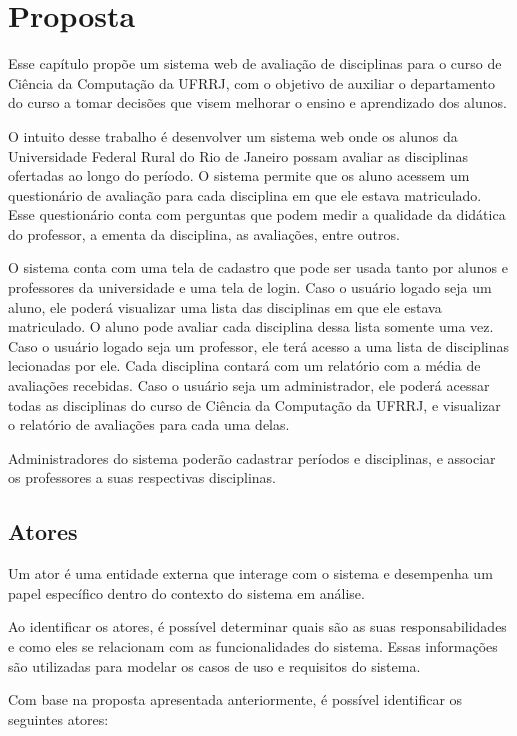 \section{Proposta}

Esse capítulo propõe um sistema web de avaliação de disciplinas para o curso de Ciência da Computação da UFRRJ, com o objetivo de auxiliar o departamento do curso a tomar decisões que visem melhorar o ensino e aprendizado dos alunos.

O intuito desse trabalho é desenvolver um sistema web onde os alunos da Universidade Federal Rural do Rio de Janeiro possam avaliar as disciplinas ofertadas ao longo do período. O sistema permite que os aluno acessem um questionário de avaliação para cada disciplina em que ele estava matriculado. Esse questionário conta com perguntas que podem medir a qualidade da didática do professor, a ementa da disciplina, as avaliações, entre outros.

O sistema conta com uma tela de cadastro que pode ser usada tanto por alunos e professores da universidade e uma tela de login. Caso o usuário logado seja um aluno, ele poderá visualizar uma lista das disciplinas em que ele estava matriculado. O aluno pode avaliar cada disciplina dessa lista somente uma vez. Caso o usuário logado seja um professor, ele terá acesso a uma lista de disciplinas lecionadas por ele. Cada disciplina contará com um relatório com a média de avaliações recebidas. Caso o usuário seja um administrador, ele poderá acessar todas as disciplinas do curso de Ciência da Computação da UFRRJ, e visualizar o relatório de avaliações para cada uma delas.

Administradores do sistema poderão cadastrar períodos e disciplinas, e associar os professores a suas respectivas disciplinas. 

\subsection{Atores}
Um ator é uma entidade externa que interage com o sistema e desempenha um papel específico dentro do contexto do sistema em análise.

Ao identificar os atores, é possível determinar quais são as suas responsabilidades e como eles se relacionam com as funcionalidades do sistema. Essas informações são utilizadas para modelar os casos de uso e requisitos do sistema.

Com base na proposta apresentada anteriormente, é possível identificar os seguintes atores:

